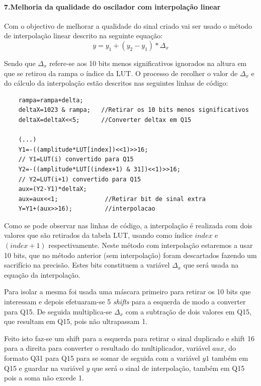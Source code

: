 \documentclass[11pt]{article}
\numberwithin{equation}{section}
\begin{document}
\paragraph{7.Melhoria da qualidade do oscilador com interpolação linear} \hspace{0pt} \label{para:P1-7}

Com o objectivo de melhorar a qualidade do sinal criado vai ser usado o método de interpolação linear descrito na seguinte equação:
\begin{equation}
y=y_{1}+(y_{2}-y_{1})*\Delta_{x}
\end{equation}                       

Sendo que $ \Delta_{x} $ refere-se aos 10 bits menos significativos ignorados na altura em que se retirou da rampa o índice da LUT. O processo de recolher o valor de $ \Delta_{x} $ e do cálculo da interpolação estão descritos nas seguintes linhas de código:

\begin{lstlisting}
	rampa=rampa+delta;
	deltaX=1023 & rampa;   //Retirar os 10 bits menos significativos
	deltaX=deltaX<<5;      //Converter deltax em Q15

	(...)
	Y1=-((amplitude*LUT[index])<<1)>>16;	
	// Y1=LUT(i) convertido para Q15
	Y2=-((amplitude*LUT[(index+1) & 31])<<1)>>16;	
	// Y2=LUT(i+1) convertido para Q15
	aux=(Y2-Y1)*deltaX;		
	aux=aux<<1;				//Retirar bit de sinal extra
	Y=Y1+(aux>>16);			//interpolacao	
\end{lstlisting}

Como se pode observar nas linhas de código, a interpolação é realizada com dois valores que são retirados da tabela LUT, usando como índice $\textit{index}$ \hspace{0,1 mm} e $(\textit{index}+1)$ respectivamente. Neste método com interpolação estaremos a usar 10 bits, que no método anterior (sem interpolação) foram descartados fazendo um sacrifício na precisão. Estes bits constituem a variável $ \Delta_{x} $ que será usada na equação da interpolação.
                                           
Para isolar a mesma foi usada uma máscara primeiro para retirar os 10 bits que interessam e depois efetuaram-se 5 \textit{shifts} para a esquerda de modo a converter para Q15. De seguida multiplica-se $\Delta_x$ com a subtração de dois valores em Q15, que resultam em Q15, pois não ultrapassam 1. 

Feito isto faz-se um shift para a esquerda para retirar o sinal duplicado e shift 16 para a direita para converter o resultado do multiplicador, variável $aux$, do formato Q31 para Q15 para se somar de seguida com a variável $y1$ também em Q15 e guardar na variável $y$ que será o sinal de interpolação, também em Q15 pois a soma não excede 1.
\end{document}
